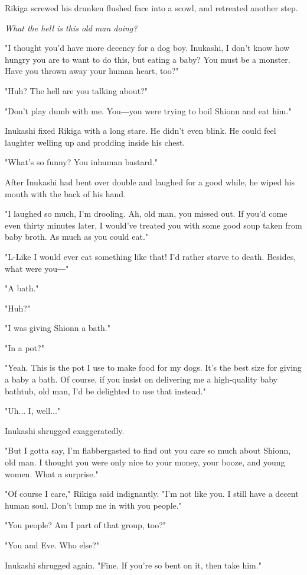Rikiga screwed his drunken flushed face into a scowl, and retreated
another step.

\emph{What the hell is this old man doing?}

"I thought you'd have more decency for a dog boy. Inukashi, I don't know
how hungry you are to want to do this, but eating a baby? You must be a
monster. Have you thrown away your human heart, too?"

"Huh? The hell are you talking about?"

"Don't play dumb with me. You―you were trying to boil Shionn and eat
him."

Inukashi fixed Rikiga with a long stare. He didn't even blink. He could
feel laughter welling up and prodding inside his chest.

"What's so funny? You inhuman bastard."

After Inukashi had bent over double and laughed for a good while, he
wiped his mouth with the back of his hand.

"I laughed so much, I'm drooling. Ah, old man, you missed out. If you'd
come even thirty minutes later, I would've treated you with some good
soup taken from baby broth. As much as you could eat."

"L-Like I would ever eat something like that! I'd rather starve to
death. Besides, what were you―"

"A bath."

"Huh?"

"I was giving Shionn a bath."

"In a pot?"

"Yeah. This is the pot I use to make food for my dogs. It's the best
size for giving a baby a bath. Of course, if you insist on delivering me
a high-quality baby bathtub, old man, I'd be delighted to use that
instead."

"Uh... I, well..."

Inukashi shrugged exaggeratedly.

"But I gotta say, I'm flabbergasted to find out you care so much about
Shionn, old man. I thought you were only nice to your money, your booze,
and young women. What a surprise."

"Of course I care," Rikiga said indignantly. "I'm not like you. I still
have a decent human soul. Don't lump me in with you people."

"You people? Am I part of that group, too?"

"You and Eve. Who else?"

Inukashi shrugged again. "Fine. If you're so bent on it, then take him."

